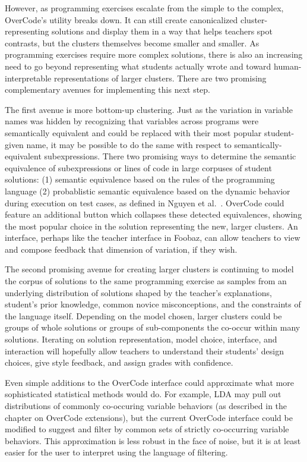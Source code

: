 However, as programming exercises escalate from the simple to the complex, OverCode's utility breaks down. It can still create canonicalized cluster-representing solutions and display them in a way that helps teachers spot contrasts, but the clusters themselves become smaller and smaller. As programming exercises require more complex solutions, there is also an increasing need to go beyond representing what students actually wrote and toward human-interpretable representations of larger clusters. There are two promising complementary avenues for implementing this next step.

The first avenue is more bottom-up clustering. Just as the variation in variable names was hidden by recognizing that variables across programs were semantically equivalent and could be replaced with their most popular student-given name, it may be possible to do the same with respect to semantically-equivalent subexpressions. There two promising ways to determine the semantic equivalence of subexpressions or lines of code in large corpuses of student solutions: (1) semantic equivalence based on the rules of the programming language (2) probablistic semantic equivalence based on the dynamic behavior during execution on test cases, as defined in Nguyen et al.~\cite{codewebs}. OverCode could feature an additional button which collapses these detected equivalences, showing the most popular choice in the solution representing the new, larger clusters. An interface, perhaps like the teacher interface in Foobaz, can allow teachers to view and compose feedback that dimension of variation, if they wish. 

The second promising avenue for creating larger clusters is continuing to model the corpus of solutions to the same programming exercise as samples from an underlying distribution of solutions shaped by the teacher's explanations, student's prior knowledge, common novice misconceptions, and the constraints of the language itself. Depending on the model chosen, larger clusters could be groups of whole solutions or groups of sub-components the co-occur within many solutions. Iterating on solution representation, model choice, interface, and interaction will hopefully allow teachers to understand their students' design choices, give style feedback, and assign grades with confidence. 

Even simple additions to the OverCode interface could approximate what more sophisticated statistical methods would do. For example, LDA may pull out distributions of commonly co-occuring variable behaviors (as described in the chapter on OverCode extensions), but the current OverCode interface could be modified to suggest and filter by common sets of strictly co-occurring variable behaviors. This approximation is less robust in the face of noise, but it is at least easier for the user to interpret using the language of filtering. %


